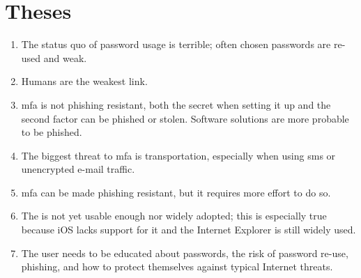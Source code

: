 \chapter*{Theses}
\thispagestyle{noheader}


\begin{enumerate}
	\setlength{\itemsep}{1cm}
	\item The status quo of password usage is terrible; often chosen passwords are re-used and weak.
	\item Humans are the weakest link.
	\item \Glsdesc{mfa} is not phishing resistant, both the secret when setting it up and the second factor can be phished or stolen. Software solutions are more probable to be phished.
	\item The biggest threat to \glsdesc{mfa} is transportation, especially when using \gls{sms} or unencrypted e-mail traffic.
	\item \Glsdesc{mfa} can be made phishing resistant, but it requires more effort to do so.
	\item The \wa{} is not yet usable enough nor widely adopted; this is especially true because iOS lacks support for it and the Internet Explorer is still widely used.
	\item The user needs to be educated about passwords, the risk of password re-use, phishing, and how to protect themselves against typical Internet threats.
\end{enumerate}
